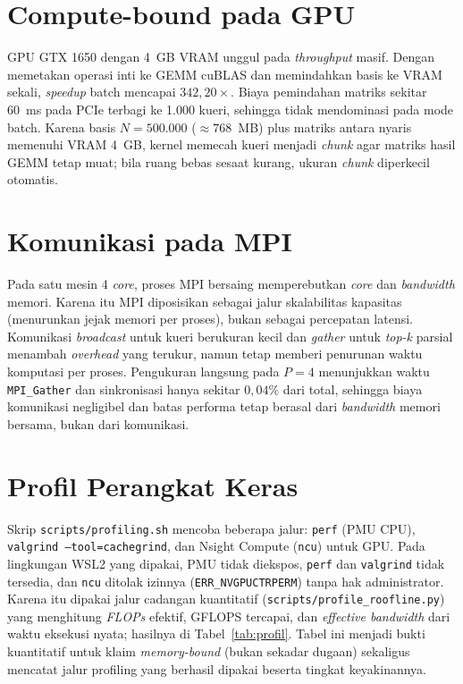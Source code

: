 \documentclass[12pt,a4paper,oneside]{report}
\begin{document}
\section{Compute-bound pada GPU}

GPU GTX 1650 dengan 4~GB VRAM unggul pada \textit{throughput} masif. Dengan memetakan operasi inti ke GEMM cuBLAS dan memindahkan basis ke VRAM sekali, \textit{speedup} batch mencapai $342{,}20\times$. Biaya pemindahan matriks sekitar 60~ms pada PCIe terbagi ke 1.000 kueri, sehingga tidak mendominasi pada mode batch. Karena basis $N=500.000$ ($\approx 768$~MB) plus matriks antara nyaris memenuhi VRAM 4~GB, kernel memecah kueri menjadi \textit{chunk} agar matriks hasil GEMM tetap muat; bila ruang bebas sesaat kurang, ukuran \textit{chunk} diperkecil otomatis.

\section{Komunikasi pada MPI}

Pada satu mesin 4 \textit{core}, proses MPI bersaing memperebutkan \textit{core} dan \textit{bandwidth} memori. Karena itu MPI diposisikan sebagai jalur skalabilitas kapasitas (menurunkan jejak memori per proses), bukan sebagai percepatan latensi. Komunikasi \textit{broadcast} untuk kueri berukuran kecil dan \textit{gather} untuk \textit{top-k} parsial menambah \textit{overhead} yang terukur, namun tetap memberi penurunan waktu komputasi per proses. Pengukuran langsung pada $P=4$ menunjukkan waktu \texttt{MPI\_Gather} dan sinkronisasi hanya sekitar $0{,}04\%$ dari total, sehingga biaya komunikasi negligibel dan batas performa tetap berasal dari \textit{bandwidth} memori bersama, bukan dari komunikasi.

\section{Profil Perangkat Keras}\label{sec:profil}

Skrip \texttt{scripts/profiling.sh} mencoba beberapa jalur: \texttt{perf} (PMU CPU), \texttt{valgrind --tool=cachegrind}, dan Nsight Compute (\texttt{ncu}) untuk GPU. Pada lingkungan WSL2 yang dipakai, PMU tidak diekspos, \texttt{perf} dan \texttt{valgrind} tidak tersedia, dan \texttt{ncu} ditolak izinnya (\texttt{ERR\_NVGPUCTRPERM}) tanpa hak administrator. Karena itu dipakai jalur cadangan kuantitatif (\texttt{scripts/profile\_roofline.py}) yang menghitung \textit{FLOPs} efektif, GFLOPS tercapai, dan \textit{effective bandwidth} dari waktu eksekusi nyata; hasilnya di Tabel~\ref{tab:profil}. Tabel ini menjadi bukti kuantitatif untuk klaim \textit{memory-bound} (bukan sekadar dugaan) sekaligus mencatat jalur profiling yang berhasil dipakai beserta tingkat keyakinannya.
\end{document}
